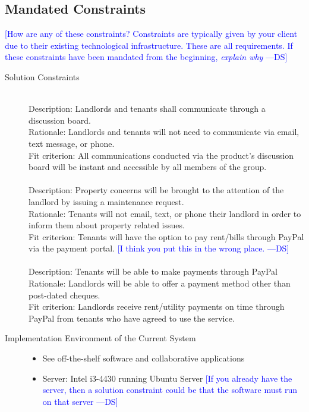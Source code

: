 \documentclass[12pt, titlepage]{article}
\newcommand{\authornote}[3]{\textcolor{#1}{[#3 ---#2]}}
\newcommand{\authornote}[3]{}
\newcommand{\ds}[1]{\authornote{blue}{DS}{#1}}
\begin{document}
\subsection{Mandated Constraints} 
\ds{How are any of these constraints? Constraints are typically given by your client
	due to their existing technological infrastructure. These are all requirements.
	If these constraints have been mandated from the beginning, \emph{explain why}} 
\begin{description}
 \item[Solution Constraints] \hfill \\
    Description: Landlords and tenants shall communicate through a discussion
    board. \\
    Rationale: Landlords and tenants will not need to communicate via email,
    text message, or phone. \\
    Fit criterion: All communications conducted via the product's discussion
    board will be instant and accessible by all members of the group. \\
    \\
    Description: Property concerns will be brought to the attention of the
    landlord by issuing a maintenance request. \\
    Rationale: Tenants will not email, text, or phone their landlord in order
    to inform them about property related issues. \\
    Fit criterion: Tenants will have the option to pay rent/bills through
    PayPal via the payment portal.
    \ds{I think you put this in the wrong place.} \\
    \\
    Description: Tenants will be able to make payments through PayPal
    Rationale: Landlords will be able to offer a payment method other than
    post-dated cheques. \\
    Fit criterion: Landlords receive rent/utility payments on time through
    PayPal from tenants who have agreed to use the service. \\
  \item[Implementation Environment of the Current System] \hfill 
    \begin{itemize}
      \item See off-the-shelf software and collaborative applications
      \item Server: Intel i3-4430 running Ubuntu Server
      \ds{If you already have the server, then a solution constraint could
      		be that the software must run on that server} \\

\end{itemize}
\end{description}
\end{document}
